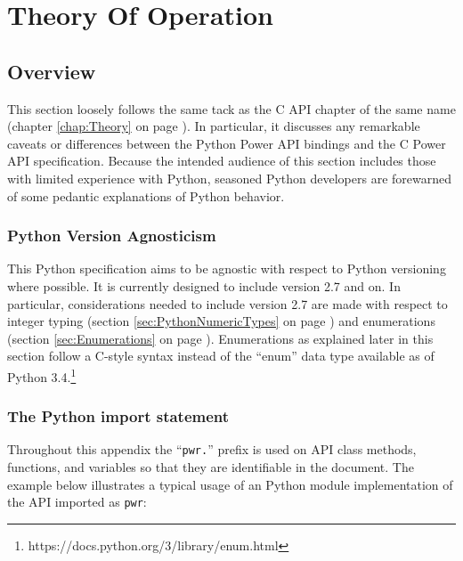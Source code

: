 \section{Theory Of Operation}\label{sec:PythonTheoryOfOperation}
\subsection{Overview}\label{sec:PythonOverview}

This section loosely follows the same tack as the C API chapter
of the same name (chapter \ref{chap:Theory} on page \pageref{chap:Theory}). In
particular, it discusses any remarkable caveats or differences between the
Python Power API bindings and the C Power API specification. Because the
intended audience of this section includes those with limited experience with
Python, seasoned Python developers are forewarned of some pedantic explanations
of Python behavior.

\subsubsection{Python Version Agnosticism}\label{sec:PythonVersionAgnosticism}

This Python specification aims to be agnostic with respect to Python versioning
where possible. It is currently designed to include version 2.7 and on. In
particular, considerations needed to include version 2.7 are made with respect
to integer typing (section \ref{sec:PythonNumericTypes} on page
\pageref{sec:PythonNumericTypes}) and enumerations (section
\ref{sec:Enumerations} on page \pageref{sec:Enumerations}). Enumerations as
explained later in this section follow a C-style syntax instead of the ``enum''
data type available as of Python
3.4.\footnote{https://docs.python.org/3/library/enum.html}

\subsubsection{The Python import statement}\label{sec:PythonImport}

Throughout this appendix the ``\texttt{pwr.}'' prefix is used on API class methods,
functions, and variables so that they are identifiable in the document. The
example below illustrates a typical usage of an Python module implementation of
the API imported as \texttt{pwr}:

